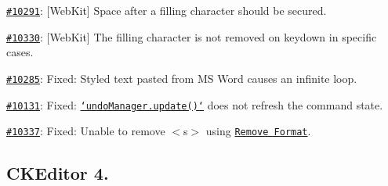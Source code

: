 \begin{DoxyItemize}
\item \href{http://dev.ckeditor.com/ticket/10291}{\tt \#10291}\-: \mbox{[}Web\-Kit\mbox{]} Space after a filling character should be secured.
\item \href{http://dev.ckeditor.com/ticket/10330}{\tt \#10330}\-: \mbox{[}Web\-Kit\mbox{]} The filling character is not removed on {\ttfamily keydown} in specific cases.
\item \href{http://dev.ckeditor.com/ticket/10285}{\tt \#10285}\-: Fixed\-: Styled text pasted from M\-S Word causes an infinite loop.
\item \href{http://dev.ckeditor.com/ticket/10131}{\tt \#10131}\-: Fixed\-: \href{http://docs.ckeditor.com/#!/api/CKEDITOR.plugins.undo.UndoManager-method-update}{\tt `undo\-Manager.update()`} does not refresh the command state.
\item \href{http://dev.ckeditor.com/ticket/10337}{\tt \#10337}\-: Fixed\-: Unable to remove {\ttfamily $<$s$>$} using \href{http://ckeditor.com/addon/removeformat}{\tt Remove Format}.
\end{DoxyItemize}

\subsection*{C\-K\-Editor 4.}


